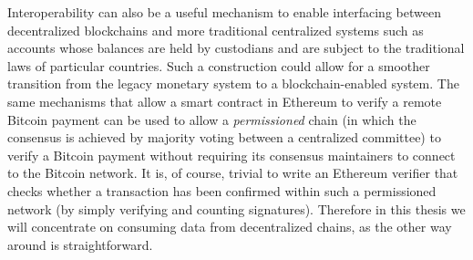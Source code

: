 

Interoperability can also be a useful mechanism to enable interfacing between
decentralized blockchains and more traditional centralized systems such as
accounts whose balances are held by custodians and are subject to the traditional
laws of particular countries. Such a construction could allow for a smoother
transition from the legacy monetary system to a blockchain-enabled system. The
same mechanisms that allow a smart contract in Ethereum to verify a remote
Bitcoin payment can be used to allow a \emph{permissioned} chain (in which the
consensus is achieved by majority voting between a centralized committee) to
verify a Bitcoin payment without requiring its consensus maintainers to connect
to the Bitcoin network. It is, of course, trivial to write an Ethereum verifier
that checks whether a transaction has been confirmed within such a permissioned
network (by simply verifying and counting signatures). Therefore in this thesis
we will concentrate on consuming data from decentralized chains, as the other
way around is straightforward.


